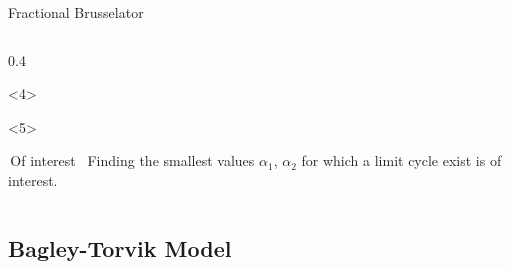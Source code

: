 \documentclass[aspectratio=169,xcolor=dvipsnames]{beamer}
\begin{document}
\begin{frame}[fragile]{Fractional Brusselator}
\begin{columns}
\begin{column}{0.4\columnwidth}
\begin{onlyenv}

\end{onlyenv}%
\begin{onlyenv}<4>
\centering

	
\end{onlyenv}
\begin{onlyenv}<5>
\begin{exampleblock}{\faQuestionCircle\,Of interest~\parencite{WANG2007414}}
Finding the smallest values $\alpha_1$, $\alpha_2$ for which a limit cycle exist is of interest.
\end{exampleblock}
\end{onlyenv}
\end{column}
\end{columns}
\end{frame}

\subsection{Bagley-Torvik Model}
\end{document}
